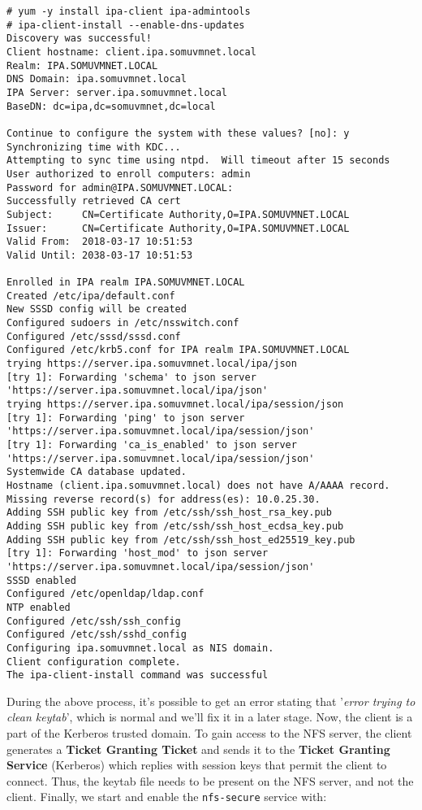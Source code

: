 \vspace{-15pt}
\begin{verbatim}
# yum -y install ipa-client ipa-admintools
# ipa-client-install --enable-dns-updates
Discovery was successful!
Client hostname: client.ipa.somuvmnet.local
Realm: IPA.SOMUVMNET.LOCAL
DNS Domain: ipa.somuvmnet.local
IPA Server: server.ipa.somuvmnet.local
BaseDN: dc=ipa,dc=somuvmnet,dc=local

Continue to configure the system with these values? [no]: y
Synchronizing time with KDC...
Attempting to sync time using ntpd.  Will timeout after 15 seconds
User authorized to enroll computers: admin
Password for admin@IPA.SOMUVMNET.LOCAL: 
Successfully retrieved CA cert
Subject:     CN=Certificate Authority,O=IPA.SOMUVMNET.LOCAL
Issuer:      CN=Certificate Authority,O=IPA.SOMUVMNET.LOCAL
Valid From:  2018-03-17 10:51:53
Valid Until: 2038-03-17 10:51:53

Enrolled in IPA realm IPA.SOMUVMNET.LOCAL
Created /etc/ipa/default.conf
New SSSD config will be created
Configured sudoers in /etc/nsswitch.conf
Configured /etc/sssd/sssd.conf
Configured /etc/krb5.conf for IPA realm IPA.SOMUVMNET.LOCAL
trying https://server.ipa.somuvmnet.local/ipa/json
[try 1]: Forwarding 'schema' to json server 'https://server.ipa.somuvmnet.local/ipa/json'
trying https://server.ipa.somuvmnet.local/ipa/session/json
[try 1]: Forwarding 'ping' to json server 'https://server.ipa.somuvmnet.local/ipa/session/json'
[try 1]: Forwarding 'ca_is_enabled' to json server 'https://server.ipa.somuvmnet.local/ipa/session/json'
Systemwide CA database updated.
Hostname (client.ipa.somuvmnet.local) does not have A/AAAA record.
Missing reverse record(s) for address(es): 10.0.25.30.
Adding SSH public key from /etc/ssh/ssh_host_rsa_key.pub
Adding SSH public key from /etc/ssh/ssh_host_ecdsa_key.pub
Adding SSH public key from /etc/ssh/ssh_host_ed25519_key.pub
[try 1]: Forwarding 'host_mod' to json server 'https://server.ipa.somuvmnet.local/ipa/session/json'
SSSD enabled
Configured /etc/openldap/ldap.conf
NTP enabled
Configured /etc/ssh/ssh_config
Configured /etc/ssh/sshd_config
Configuring ipa.somuvmnet.local as NIS domain.
Client configuration complete.
The ipa-client-install command was successful
\end{verbatim}
\vspace{-10pt}	

\noindent
During the above process, it's possible to get an error stating that '\textit{error trying to clean keytab}', which is normal and we'll fix it in a later stage. Now, the client is a part of the Kerberos trusted domain. To gain access to the NFS server, the client generates a \textbf{Ticket Granting Ticket} and sends it to the \textbf{Ticket Granting Service} (Kerberos) which replies with session keys that permit the client to connect. Thus, the keytab file needs to be present on the NFS server, and not the client. Finally, we start and enable the \verb|nfs-secure| service with:


